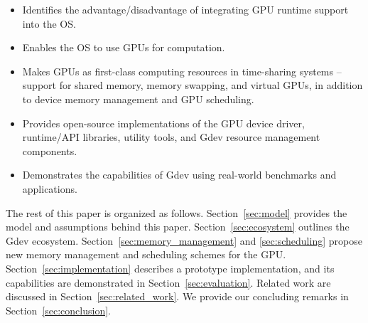 \begin{itemize}
 \vspace{-0.25em}
 \item Identifies the advantage/disadvantage of integrating GPU runtime
       support into the OS.
 \vspace{-0.5em}
 \item Enables the OS to use GPUs for computation.
 \vspace{-0.5em}
 \item Makes GPUs as first-class computing resources in time-sharing
       systems -- support for shared memory, memory swapping,
       and virtual GPUs, in addition to device memory management and GPU
       scheduling.
 \vspace{-0.5em}
 \item Provides open-source implementations of the GPU device driver,
       runtime/API libraries, utility tools, and Gdev resource
       management components.
 \vspace{-0.5em}
 \item Demonstrates the capabilities of Gdev using real-world benchmarks
       and applications.
 \vspace{-0.25em}
\end{itemize}

The rest of this paper is organized as follows.
Section~\ref{sec:model} provides the model and assumptions behind
this paper.
Section~\ref{sec:ecosystem} outlines the Gdev ecosystem.
Section~\ref{sec:memory_management} and \ref{sec:scheduling} propose new
memory management and scheduling schemes for the GPU.
Section~\ref{sec:implementation} describes a prototype implementation,
and its capabilities are demonstrated in Section~\ref{sec:evaluation}.
Related work are discussed in Section~\ref{sec:related_work}.
We provide our concluding remarks in Section~\ref{sec:conclusion}.
